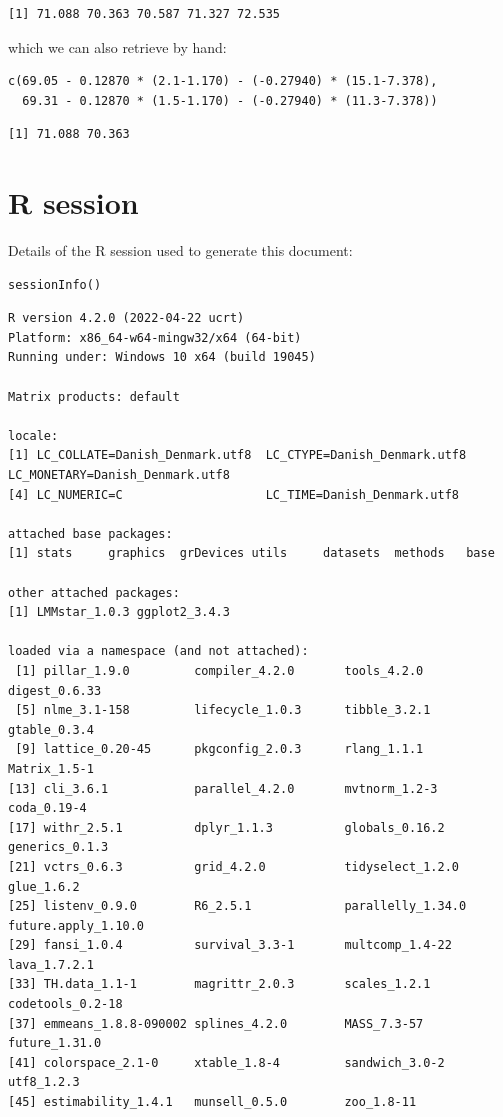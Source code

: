 \documentclass[12pt]{article}
\begin{document}
\begin{verbatim}
[1] 71.088 70.363 70.587 71.327 72.535
\end{verbatim}


which we can also retrieve by hand:
\lstset{language=r,label= ,caption= ,captionpos=b,numbers=none}
\begin{lstlisting}
c(69.05 - 0.12870 * (2.1-1.170) - (-0.27940) * (15.1-7.378),
  69.31 - 0.12870 * (1.5-1.170) - (-0.27940) * (11.3-7.378))
\end{lstlisting}

\begin{verbatim}
[1] 71.088 70.363
\end{verbatim}



\clearpage

\section{R session}
\label{sec:org6b6b7ec}
Details of the R session used to generate this document:
\lstset{language=r,label= ,caption= ,captionpos=b,numbers=none}
\begin{lstlisting}
sessionInfo()
\end{lstlisting}

\begin{verbatim}
R version 4.2.0 (2022-04-22 ucrt)
Platform: x86_64-w64-mingw32/x64 (64-bit)
Running under: Windows 10 x64 (build 19045)

Matrix products: default

locale:
[1] LC_COLLATE=Danish_Denmark.utf8  LC_CTYPE=Danish_Denmark.utf8    LC_MONETARY=Danish_Denmark.utf8
[4] LC_NUMERIC=C                    LC_TIME=Danish_Denmark.utf8    

attached base packages:
[1] stats     graphics  grDevices utils     datasets  methods   base     

other attached packages:
[1] LMMstar_1.0.3 ggplot2_3.4.3

loaded via a namespace (and not attached):
 [1] pillar_1.9.0         compiler_4.2.0       tools_4.2.0          digest_0.6.33       
 [5] nlme_3.1-158         lifecycle_1.0.3      tibble_3.2.1         gtable_0.3.4        
 [9] lattice_0.20-45      pkgconfig_2.0.3      rlang_1.1.1          Matrix_1.5-1        
[13] cli_3.6.1            parallel_4.2.0       mvtnorm_1.2-3        coda_0.19-4         
[17] withr_2.5.1          dplyr_1.1.3          globals_0.16.2       generics_0.1.3      
[21] vctrs_0.6.3          grid_4.2.0           tidyselect_1.2.0     glue_1.6.2          
[25] listenv_0.9.0        R6_2.5.1             parallelly_1.34.0    future.apply_1.10.0 
[29] fansi_1.0.4          survival_3.3-1       multcomp_1.4-22      lava_1.7.2.1        
[33] TH.data_1.1-1        magrittr_2.0.3       scales_1.2.1         codetools_0.2-18    
[37] emmeans_1.8.8-090002 splines_4.2.0        MASS_7.3-57          future_1.31.0       
[41] colorspace_2.1-0     xtable_1.8-4         sandwich_3.0-2       utf8_1.2.3          
[45] estimability_1.4.1   munsell_0.5.0        zoo_1.8-11
\end{verbatim}
\end{document}
